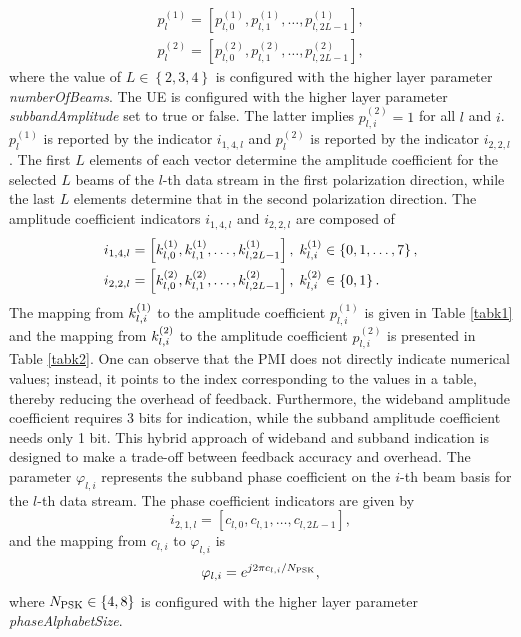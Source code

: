 \documentclass[lettersize,journal]{IEEEtran}
\begin{document}
\begin{equation}
\begin{aligned}
p_l^{(1)} = [p_{l,0}^{(1)},p_{l,1}^{(1)}, \ldots ,p_{l,2L - 1}^{(1)}],\\
p_l^{(2)} = [p_{l,0}^{(2)},p_{l,1}^{(2)}, \ldots ,p_{l,2L - 1}^{(2)}],
\end{aligned}
\end{equation}
where the value of $L \in \left\{ {2,3,4} \right\}$  is configured with the higher layer parameter \emph{numberOfBeams}. The UE is configured with the higher layer parameter \emph{subbandAmplitude} set to true or false. The latter implies \(p^{(2)}_{l,i}=1\) for all $l$ and $i$. $p_l^{(1)}$ is reported by the indicator $i_{1,4,l}$ and $p_l^{(2)}$ is reported by the indicator $i_{2,2,l}$. The first \(L\) elements of each vector determine the amplitude coefficient for the selected \(L\) beams of the \(l\)-th data stream in the first polarization direction, while the last \(L\) elements determine that in the second polarization direction. The amplitude coefficient indicators $i_{1,4,l}$ and $i_{2,2,l}$ are composed of 
\begin{equation}\label{a48}
\begin{aligned}
&{i_{1,4,l}} = \left[ {k_{l,0}^{{\rm{(1)}}},k_{l,1}^{{\rm{(1)}}}, \ldots ,k_{l,2L - 1}^{{\rm{(1)}}}} \right],\;k_{l,i}^{{\rm{(1)}}} \in \left\{ {0,1, \ldots ,7} \right\},\\
&{i_{2,2,l}} = \left[ {k_{l,0}^{{\rm{(2)}}},k_{l,1}^{{\rm{(2)}}}, \ldots ,k_{l,2L - 1}^{{\rm{(2)}}}} \right],\;k_{l,i}^{{\rm{(2)}}} \in \left\{ {0,1} \right\}.
\end{aligned}
\end{equation}
The mapping from $k_{l,i}^{{\rm{(1)}}}$ to the amplitude coefficient $p_{l,i}^{(1)}$ is given in Table \ref{tabk1} and the mapping from $k_{l,i}^{{\rm{(2)}}}$  to the amplitude coefficient $p_{l,i}^{(2)}$ is presented in Table \ref{tabk2}. One can observe that the PMI does not directly indicate numerical values; instead, it points to the index corresponding to the values in a table, thereby reducing the overhead of feedback. Furthermore, the wideband amplitude coefficient requires 3 bits for indication, while the subband amplitude coefficient needs only 1 bit. This hybrid approach of wideband and subband indication is designed to make a trade-off between feedback accuracy and overhead. The parameter ${\varphi _{l,i}}$ represents the subband phase coefficient on the $i$-th beam basis for the $l$-th data stream. The phase coefficient indicators are given by
\begin{equation}\label{a49}
{i_{2,1,l}} = \left[ {{c_{l,0}},{c_{l,1}}, \ldots ,{c_{l,2L - 1}}} \right],
\end{equation}
and the mapping from ${c_{l,i}}$ to ${\varphi _{l,i}}$ is 
\begin{equation}
{\varphi _{l,i}} = {e^{j{{2\pi {c_{l,i}}} \mathord{\left/
 {\vphantom {{2\pi {c_{l,i}}} {{N_{{\rm{PSK}}}}}}} \right.
 \kern-\nulldelimiterspace} {{N_{{\rm{PSK}}}}}}}},
 \end{equation}
where ${N_{{\rm{PSK}}}} \in \left\{ {4,8} \right\}$  is configured with the higher layer parameter \emph{phaseAlphabetSize}.
\end{document}
